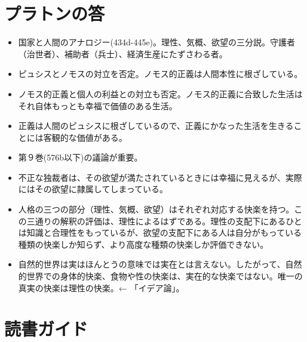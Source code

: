 \documentclass[uplatex]{bxjsarticle}
\begin{document}
\section{プラトンの答}

\begin{itemize}

\item 国家と人間のアナロジー(434d-445e)。理性、気概、欲望の三分説。守護者（治世者）、補助者（兵士）、経済生産にたずさわる者。
\item ピュシスとノモスの対立を否定。ノモス的正義は人間本性に根ざしている。
\item ノモス的正義と個人の利益との対立も否定。ノモス的正義に合致した生活はそれ自体もっとも幸福で価値のある生活。

\item 正義は人間のピュシスに根ざしているので、正義にかなった生活を生きることには客観的な価値がある。


\item 第９巻(576b以下)の議論が重要。

\item 不正な独裁者は、その欲望が満たされているときには幸福に見えるが、実際にはその欲望に隷属してしまっている。

\item 人格の三つの部分（理性、気概、欲望）はそれぞれ対応する快楽を持つ。この三通りの解釈の評価は、理性によるはずである。理性の支配下にあるひとは知識と合理性をもっているが、欲望の支配下にある人は自分がもっている種類の快楽しか知らず、より高度な種類の快楽しか評価できない。

\item 自然的世界は実はほんとうの意味では実在とは言えない。したがって、自然的世界での身体的快楽、食物や性の快楽は、実在的な快楽ではない。唯一の真実の快楽は理性の快楽。← 「イデア論」。





\end{itemize}







\nocite{田中美知太郎57:ソクラテス}
\nocite{中公世界の名著:プラトン1}
\nocite{プラトン57:ゴルギアス}
\nocite{プラトン64:ソクラテスの弁明クリトン}
\nocite{プラトン田中66:国家}
\nocite{プラトン藤沢66:ゴルギアス}
\nocite{納富信留06:ソフィスト}


\section{読書ガイド}
\end{document}
